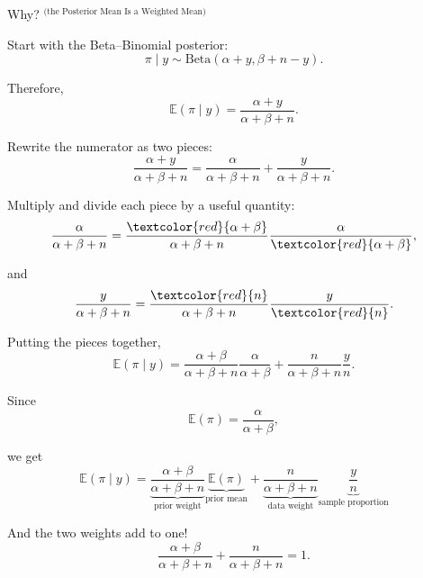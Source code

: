 \begin{frame}{Why? $^\text{(the Posterior Mean Is a Weighted Mean)}$}
\footnotesize

Start with the Beta--Binomial posterior:
\[
\pi \mid y
\sim
\mathrm{Beta}(\alpha+y,\beta+n-y).
\]

Therefore,
\[
\mathbb{E}(\pi \mid y)
=
\frac{\alpha+y}{\alpha+\beta+n}.
\]

Rewrite the numerator as two pieces:
\[
\frac{\alpha+y}{\alpha+\beta+n}
=
\frac{\alpha}{\alpha+\beta+n}
+
\frac{y}{\alpha+\beta+n}.
\]

\pause

\vspace{.4cm}
Multiply and divide each piece by a useful quantity:
\[
\frac{\alpha}{\alpha+\beta+n}
=
\frac{\textcolor{red}{\alpha+\beta}}{\alpha+\beta+n}
\frac{\alpha}{\textcolor{red}{\alpha+\beta}},
\]

and
\[
\frac{y}{\alpha+\beta+n}
=
\frac{\textcolor{red}{n}}{\alpha+\beta+n}
\frac{y}{\textcolor{red}{n}}.
\]

\end{frame}

\begin{frame}{}
\footnotesize

Putting the pieces together,
\[
\mathbb{E}(\pi\mid y)
=
\frac{\alpha+\beta}{\alpha+\beta+n}
\frac{\alpha}{\alpha+\beta}
+
\frac{n}{\alpha+\beta+n}
\frac{y}{n}.
\]

Since
\[
\mathbb{E}(\pi)=\frac{\alpha}{\alpha+\beta},
\]

we get
\[
\boxed{
\mathbb{E}(\pi\mid y)
=
\underbrace{
\frac{\alpha+\beta}{\alpha+\beta+n}
}_{\text{prior weight}}
\underbrace{
\mathbb{E}(\pi)
}_{\text{prior mean}}
+
\underbrace{
\frac{n}{\alpha+\beta+n}
}_{\text{data weight}}
\underbrace{
\frac{y}{n}
}_{\text{sample proportion}}
}
\]

And the two weights add to one!
\[
\frac{\alpha+\beta}{\alpha+\beta+n}
+
\frac{n}{\alpha+\beta+n}
=1.
\]

\end{frame}

